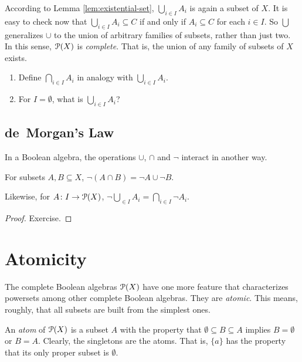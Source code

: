  According to Lemma \ref{lem:existential-set}, $\bigcup_{i\in I}A_i$ is again a subset of $X$. It is 
easy to check now that $\bigcup_{i\in I}A_i\subseteq C$ if and only if $A_i\subseteq C$ for each $i\in I$. So $\bigcup$ generalizes $\cup$ to the union of arbitrary families of subsets, rather than just two.  In this sense, ${\mathcal{P}}(X)$ is \emph{complete}. That is, the union of any family of subsets of $X$ exists.

\begin{exercises}
	\begin{enumerate}
		\item Define $\bigcap_{i\in I}A_i$ in analogy with $\bigcup_{i\in I}A_i$.
		\item For $I=\emptyset$, what is $\bigcup_{i\in I}A_i$?
	\end{enumerate}
\end{exercises}

\subsection*{de~Morgan's Law}

In a Boolean algebra, the operations $\cup$, $\cap$ and $\neg$ interact in another way.

\begin{lemma}
	For subsets $A,B\subseteq X$, $\neg(A\cap B) = \neg A\cup \neg B$.
	
	Likewise, for ${A}\colon{I}\to{{\mathcal{P}}(X)}$, $\neg\bigcup_{\in I}A_i = \bigcap_{i\in I}\neg A_i$.
	
	\begin{proof}
		Exercise.
	\end{proof}
\end{lemma}

\section{Atomicity}

The complete Boolean algebras ${\mathcal{P}}(X)$ have one more feature that characterizes powersets among other complete Boolean algebras.
They are \emph{atomic}. This means, roughly, that all subsets are built from the simplest ones.

An \emph{atom} of ${\mathcal{P}}(X)$ is a subset $A$ with the property that $\emptyset\subseteq B\subseteq A$ implies $B=\emptyset$ or $B=A$. Clearly,
the singletons are the atoms. That is, $\{a\}$ has the property that its only proper subset is $\emptyset$.

